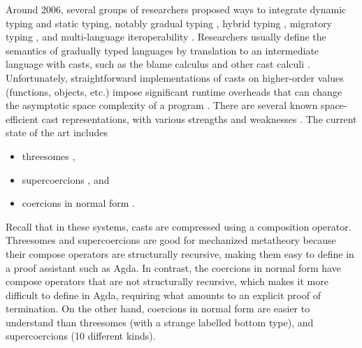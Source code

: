 \documentclass[acmsmall,review,anonymous]{acmart}\settopmatter{printfolios=true,printccs=false,printacmref=false}
\begin{document}
Around 2006, several groups of researchers proposed ways to integrate
dynamic typing and static typing, notably gradual typing
\citep{siek2006gradual}, hybrid typing \citep{flanagan2006hybrid},
migratory typing \citep{Tobin-Hochstadt:2006fk}, and multi-language
iteroperability \citep{Gray:2005ij,Matthews:2007zr}. Researchers
usually define the semantics of gradually typed languages by
translation to an intermediate language with casts, such as the blame
calculus \citep{wadler2009well} and other cast calculi
\citep{siek2009exploring}. Unfortunately, straightforward
implementations of casts on higher-order values (functions, objects,
etc.) impose significant runtime overheads that can change the
asymptotic space complexity of a program
\citep{herman2010space}. There are several known space-efficient cast
representations, with various strengths and weaknesses
\citep{siek2015blame,siek2010threesomes,garcia2013calculating,kuhlenschmidt2018efficient,siek2012interpretations,garcia2014deriving}.
The current state of the art includes

\begin{itemize}
\item threesomes \citep{siek2010threesomes,garcia2013calculating},
\item supercoercions \citep{garcia2013calculating}, and
\item coercions in normal form
  \citep{siek2012interpretations,siek2015blame}.
\end{itemize}
Recall that in these systems, casts are compressed using a composition
operator.  Threesomes and supercoercions are good for mechanized
metatheory because their compose operators are structurally recursive,
making them easy to define in a proof assistant such as Agda. In
contrast, the coercions in normal form have compose operators that are
not structurally recursive, which makes it more difficult to define in
Agda, requiring what amounts to an explicit proof of termination.
%
On the other hand, coercions in normal form are easier to understand
than threesomes (with a strange labelled bottom type), and
supercoercions (10 different kinds).
\end{document}
